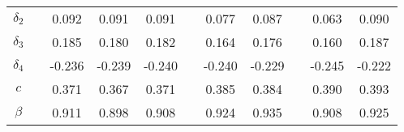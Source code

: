 \begin{tabular}{crccccccccc}
$\delta_{2}$ &           & 0.092     & 0.091     & 0.091     &           & 0.077     & 0.087     &           & 0.063     & 0.090 \\
$\delta_{3}$ &           & 0.185     & 0.180     & 0.182     &           & 0.164     & 0.176     &           & 0.160     & 0.187 \\
$\delta_{4}$ &           & -0.236    & -0.239    & -0.240    &           & -0.240    & -0.229    &           & -0.245    & -0.222 \\
$c$       &           & 0.371     & 0.367     & 0.371     &           & 0.385     & 0.384     &           & 0.390     & 0.393 \\
$\beta$   &           & 0.911     & 0.898     & 0.908     &           & 0.924     & 0.935     &           & 0.908     & 0.925 \\
\bottomrule
\bottomrule
\end{tabular}%
